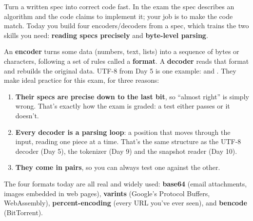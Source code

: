 \documentclass[10pt,a4paper]{article}
\begin{document}
\makecover
\setcounter{page}{2}
\makefrontmatter
\begin{goalbox}
Turn a written spec into correct code fast. In the exam the spec describes an algorithm and the code claims to implement it; your job is to make the code match. Today you build four encoders/decoders from a spec, which trains the two skills you need: \textbf{reading specs precisely} and \textbf{byte-level parsing}.
\end{goalbox}
\vspace{2pt}
An \textbf{encoder} turns some data (numbers, text, lists) into a sequence of bytes or characters, following a set of rules called a \textbf{format}. A \textbf{decoder} reads that format and rebuilds the original data. UTF-8 from Day 5 is one example:  and .
They make ideal practice for this exam, for three reasons:
\begin{enumerate}
\item \textbf{Their specs are precise down to the last bit}, so “almost right” is simply wrong. That’s exactly how the exam is graded: a test either passes or it doesn’t.
\item \textbf{Every decoder is a parsing loop}: a position that moves through the input, reading one piece at a time. That’s the same structure as the UTF-8 decoder (Day 5), the tokenizer (Day 9) and the snapshot reader (Day 10).
\item \textbf{They come in pairs}, so you can always test one against the other.
\end{enumerate}
The four formats today are all real and widely used: \textbf{base64} (email attachments, images embedded in web pages), \textbf{varints} (Google’s Protocol Buffers, WebAssembly), \textbf{percent-encoding} (every URL you’ve ever seen), and \textbf{bencode} (BitTorrent).
\setcounter{section}{0}
\end{document}
